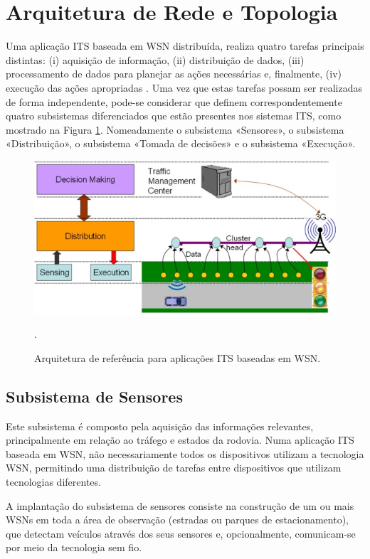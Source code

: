 \documentclass[
	12pt,				%
	oneside,			%
	a4paper,			%
	english,			%
	brazil				%
	]{abntex2ppgsi}
\begin{document}
\section{Arquitetura de Rede e Topologia}

Uma aplicação ITS baseada em WSN distribuída, realiza quatro tarefas principais distintas: (i) aquisição de informação, (ii) distribuição de dados, (iii) processamento de dados para planejar as ações necessárias e, finalmente, (iv) execução das ações apropriadas  \cite{losilla2011comprehensive}. Uma vez que estas tarefas possam ser realizadas de forma independente, pode-se considerar que definem correspondentemente quatro subsistemas diferenciados que estão presentes nos sistemas ITS, como mostrado na Figura \ref{fig:arquiteturas_its_wsn}. Nomeadamente o subsistema «Sensores», o subsistema «Distribuição», o subsistema «Tomada de decisões» e o subsistema «Execução». 

\begin{figure}[h!]
	\centering
	\includegraphics[width=0.8\columnwidth]{images/camadas_wsn.jpg}
	\caption{Arquitetura de referência para aplicações ITS baseadas em WSN. \cite{losilla2011comprehensive}}.
	\label{fig:arquiteturas_its_wsn}
\end{figure}

\subsection{Subsistema de Sensores}

Este subsistema é composto pela aquisição das informações relevantes, principalmente em relação ao tráfego e estados da rodovia. Numa aplicação ITS baseada em WSN, não necessariamente todos os dispositivos utilizam a tecnologia WSN, permitindo uma distribuição de tarefas entre dispositivos que utilizam tecnologias diferentes. 

A implantação do subsistema de sensores consiste na construção de um ou mais WSNs em toda a área de observação (estradas ou parques de estacionamento), que detectam veículos através dos seus sensores e, opcionalmente, comunicam-se por meio da tecnologia sem fio. 
\end{document}
